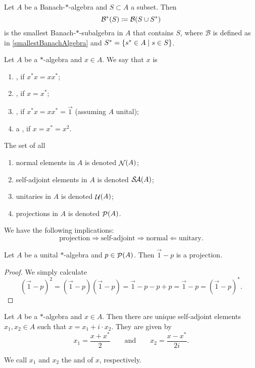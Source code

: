 \begin{proposition} \label{smallestBanach*Algebra}
Let $A$ be a Banach-$*$-algebra and $S\subset A$ a subset. Then
\[ \mathcal{B}^*(S) \coloneqq \mathcal{B}(S\cup S^*) \]
is the smallest Banach-$*$-subalgebra in $A$ that contains $S$, where $\mathcal{B}$ is defined as in \ref{smallestBanachAlgebra} and $S^* = \left\{ s^*\in A \;\middle|\; s\in S \right\}$.
\end{proposition}

\begin{definition}
Let $A$ be a $*$-algebra and $x\in A$. We say that $x$ is
\begin{enumerate}
\item {}, if $x^*x = xx^*$;
\item {}, if $x=x^*$;
\item {}, if $x^*x = xx^* = \vec{1}$ (assuming $A$ unital);
\item a , if $x=x^*=x^2$.
\end{enumerate}
The set of all
\begin{enumerate}
\item normal elements in $A$ is denoted $\mathop{\mathcal{N}}\nolimits(A)$;
\item self-adjoint elements in $A$ is denoted $\mathop{\mathcal{S}\hspace{-0.15em}\mathcal{A}}\nolimits(A)$;
\item unitaries in $A$ is denoted $\mathop{\mathcal{U}}\nolimits(A)$;
\item projections in $A$ is denoted $\mathop{\mathcal{P}}\nolimits(A)$.
\end{enumerate}

\end{definition}
\begin{lemma}
We have the following implications:
\[ \text{projection} \Rightarrow \text{self-adjoint} \Rightarrow \text{normal} \Leftarrow \text{unitary}. \]
\end{lemma}

\begin{lemma} \label{orthogonalProjection}
Let $A$ be a unital $*$-algebra and $p\in\mathop{\mathcal{P}}\nolimits(A)$. Then $\vec{1}-p$ is a projection.
\end{lemma}
\begin{proof}
We simply calculate
\[ (\vec{1}-p)^2 = (\vec{1}-p)(\vec{1}-p) = \vec{1} - p -p + p = \vec{1}-p = (\vec{1}-p)^*. \]
\end{proof}

\begin{lemma} \label{realImaginaryParts}
Let $A$ be a $*$-algebra and $x\in A$. Then there are unique self-adjoint elements $x_1,x_2\in A$ such that $x = x_1+i\cdot x_2$. They are given by
\[ x_1 = \frac{x+x^*}{2} \qquad \text{and} \qquad x_2 = \frac{x-x^*}{2i}. \]
\end{lemma}
We call $x_1$ and $x_2$ the  and  of $x$, respectively.

